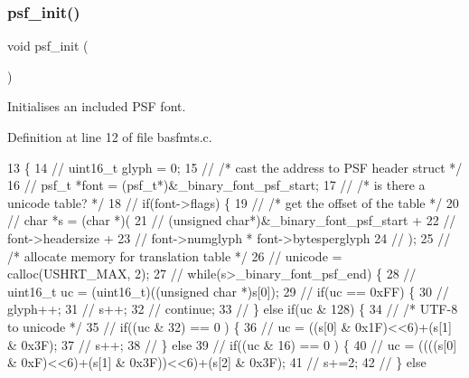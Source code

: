 \subsubsection{\texorpdfstring{psf\+\_\+init()}{psf\_init()}}
{\footnotesize\ttfamily void psf\+\_\+init (\begin{DoxyParamCaption}{ }\end{DoxyParamCaption})}



Initialises an included P\+SF font. 



Definition at line 12 of file basfmts.\+c.


\begin{DoxyCode}
13 \{
14     \textcolor{comment}{// uint16\_t glyph = 0;}
15     \textcolor{comment}{// /* cast the address to PSF header struct */}
16     \textcolor{comment}{// psf\_t *font = (psf\_t*)&\_binary\_font\_psf\_start;}
17     \textcolor{comment}{// /* is there a unicode table? */}
18     \textcolor{comment}{// if(font->flags) \{}
19     \textcolor{comment}{//     /* get the offset of the table */}
20     \textcolor{comment}{//     char *s = (char *)(}
21     \textcolor{comment}{//       (unsigned char*)&\_binary\_font\_psf\_start +}
22     \textcolor{comment}{//       font->headersize +}
23     \textcolor{comment}{//       font->numglyph * font->bytesperglyph}
24     \textcolor{comment}{//     );}
25     \textcolor{comment}{//     /* allocate memory for translation table */}
26     \textcolor{comment}{//     unicode = calloc(USHRT\_MAX, 2);}
27     \textcolor{comment}{//     while(s>\_binary\_font\_psf\_end) \{}
28     \textcolor{comment}{//         uint16\_t uc = (uint16\_t)((unsigned char *)s[0]);}
29     \textcolor{comment}{//         if(uc == 0xFF) \{}
30     \textcolor{comment}{//             glyph++;}
31     \textcolor{comment}{//             s++;}
32     \textcolor{comment}{//             continue;}
33     \textcolor{comment}{//         \} else if(uc & 128) \{}
34     \textcolor{comment}{//             /* UTF-8 to unicode */}
35     \textcolor{comment}{//             if((uc & 32) == 0 ) \{}
36     \textcolor{comment}{//                 uc = ((s[0] & 0x1F)<<6)+(s[1] & 0x3F);}
37     \textcolor{comment}{//                 s++;}
38     \textcolor{comment}{//             \} else}
39     \textcolor{comment}{//             if((uc & 16) == 0 ) \{}
40     \textcolor{comment}{//                 uc = ((((s[0] & 0xF)<<6)+(s[1] & 0x3F))<<6)+(s[2] & 0x3F);}
41     \textcolor{comment}{//                 s+=2;}
42     \textcolor{comment}{//             \} else}

\end{DoxyCode}
